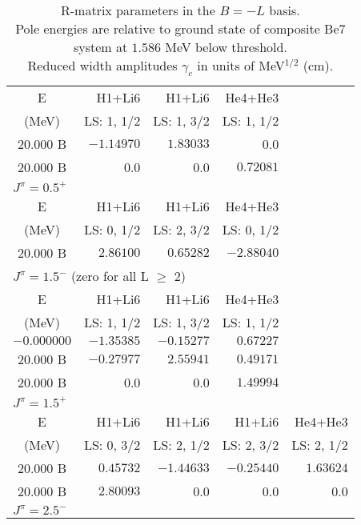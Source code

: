 \documentclass[aps]{revtex4}
\begin{document}
 \begin{longtable}{c|rrrr} 
\caption{ 
R-matrix parameters  in the $B = -L$ basis. \\ Pole energies are relative to ground state of composite Be7 system at $1.586$ MeV below threshold. \\ Reduced width amplitudes $\gamma_c$ in units of MeV$^{1/2}$ (cm). 
}\\[1pt] 
\hline\hline 
\endhead 
\hline 
\endfoot 
\hline\multicolumn{5}{l}{ $J^\pi = 0.5^-$  \rule{0pt}{7pt}}\\[1pt]\hline
E& H1+Li6 & H1+Li6 & He4+He3 \\[1pt]
(MeV)& LS: 1, 1/2 & LS: 1, 3/2 & LS: 1, 1/2 \\[1pt]
20.000 B & $-1.14970$ & $1.83033$ & 0.0 \rule{0pt}{8pt}\\[1pt]
20.000 B & 0.0 & 0.0 & $0.72081$ \rule{0pt}{8pt}\\[1pt]
\hline\multicolumn{5}{l}{ $J^\pi = 0.5^+$  \rule{0pt}{7pt}}\\[1pt]\hline
E& H1+Li6 & H1+Li6 & He4+He3 \\[1pt]
(MeV)& LS: 0, 1/2 & LS: 2, 3/2 & LS: 0, 1/2 \\[1pt]
20.000 B & $2.86100$ & $0.65282$ & $-2.88040$ \rule{0pt}{8pt}\\[1pt]
\hline\multicolumn{5}{l}{ $J^\pi = 1.5^-$  (zero for all L $\geq$ 2) \rule{0pt}{7pt}}\\[1pt]\hline
E& H1+Li6 & H1+Li6 & He4+He3 \\[1pt]
(MeV)& LS: 1, 1/2 & LS: 1, 3/2 & LS: 1, 1/2 \\[1pt]
$-0.000000$ & $-1.35385$ & $-0.15277$ & $0.67227$ \rule{0pt}{8pt}\\[1pt]
20.000 B & $-0.27977$ & $2.55941$ & $0.49171$ \rule{0pt}{8pt}\\[1pt]
20.000 B & 0.0 & 0.0 & $1.49994$ \rule{0pt}{8pt}\\[1pt]
\hline\multicolumn{5}{l}{ $J^\pi = 1.5^+$  \rule{0pt}{7pt}}\\[1pt]\hline
E& H1+Li6 & H1+Li6 & H1+Li6 & He4+He3 \\[1pt]
(MeV)& LS: 0, 3/2 & LS: 2, 1/2 & LS: 2, 3/2 & LS: 2, 1/2 \\[1pt]
20.000 B & $0.45732$ & $-1.44633$ & $-0.25440$ & $1.63624$ \rule{0pt}{8pt}\\[1pt]
20.000 B & $2.80093$ & 0.0 & 0.0 & 0.0 \rule{0pt}{8pt}\\[1pt]
\hline\multicolumn{5}{l}{ $J^\pi = 2.5^-$  \rule{0pt}{7pt}}\\[1pt]\hline

\end{longtable}
\end{document}
